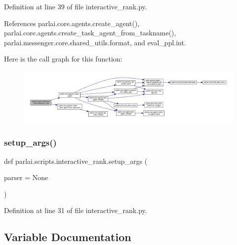 Definition at line 39 of file interactive\+\_\+rank.\+py.



References parlai.\+core.\+agents.\+create\+\_\+agent(), parlai.\+core.\+agents.\+create\+\_\+task\+\_\+agent\+\_\+from\+\_\+taskname(), parlai.\+messenger.\+core.\+shared\+\_\+utils.\+format, and eval\+\_\+ppl.\+int.

Here is the call graph for this function\+:
\nopagebreak
\begin{figure}[H]
\begin{center}
\leavevmode
\includegraphics[width=350pt]{namespaceparlai_1_1scripts_1_1interactive__rank_a9997f1d0eba4a72a45a773ec05874af3_cgraph}
\end{center}
\end{figure}
\mbox{\label{namespaceparlai_1_1scripts_1_1interactive__rank_af87c6b5d3f8843e51461c9cfd75fd510}} 
\subsubsection{\texorpdfstring{setup\+\_\+args()}{setup\_args()}}
{\footnotesize\ttfamily def parlai.\+scripts.\+interactive\+\_\+rank.\+setup\+\_\+args (\begin{DoxyParamCaption}\item[{}]{parser = {\ttfamily None} }\end{DoxyParamCaption})}



Definition at line 31 of file interactive\+\_\+rank.\+py.



\subsection{Variable Documentation}
\mbox{\label{namespaceparlai_1_1scripts_1_1interactive__rank_a68288547427936a867a1b8eb9a945be7}} 
